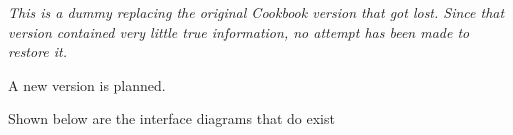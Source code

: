%


\it
	This is a dummy replacing the original Cookbook version that got lost.
Since that version contained very little true information, no attempt has been
made to restore it.

	A new version is planned.

	Shown below are the interface diagrams that do exist







